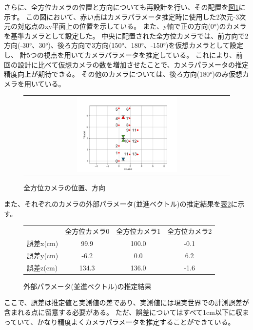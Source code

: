 \documentclass[]{jarticle}          %
\begin{document}
さらに、全方位カメラの位置と方向についても再設計を行い、その配置を\hyperref[three]{図\ref{three}}に示す。
この図において、赤い点はカメラパラメータ推定時に使用した2次元-3次元の対応点のxy平面上の位置を示している。
また、y軸で正の方向(0°)のカメラを基準カメラとして設定した。
中央に配置された全方位カメラでは、前方向で2方向(-30°、30°)、後ろ方向で3方向(150°、180°、-150°)を仮想カメラとして設定し、
計5つの視点を用いてカメラパラメータを推定している。
これにより、前回の設計に比べて仮想カメラの数を増加させたことで、カメラパラメータの推定精度向上が期待できる。
その他のカメラについては、後ろ方向(180°)のみ仮想カメラを用いている。
\begin{figure}[H]
  \begin{center}
    \begin{tabular}{c}
      \includegraphics[width=0.5\textwidth]{figures/plot_campos.png}
    \end{tabular}
  \end{center}
  \caption{全方位カメラの位置、方向}
  \label{three}
\end{figure}

また、それぞれのカメラの外部パラメータ(並進ベクトル)の推定結果を\hyperref[table2]{表\ref{table2}}に示す。
\begin{figure}[H]
  \begin{center}
    \begin{tabular}{lccc}
    & 全方位カメラ0 & 全方位カメラ1 & 全方位カメラ2 \\
    誤差x(cm) & 99.9 & 100.0 & -0.1 \\
    誤差y(cm) & -6.2 & 0.0 & 6.2 \\
    誤差z(cm) & 134.3 & 136.0 & -1.6
    \end{tabular}
  \end{center}
  \caption{外部パラメータ(並進ベクトル)の推定結果}
  \label{table2}
\end{figure}
ここで、誤差は推定値と実測値の差であり、実測値には現実世界での計測誤差が含まれる点に留意する必要がある。
ただ、誤差についてはすべて1cm以下に収まっていて、かなり精度よくカメラパラメータを推定することができている。
\end{document}
